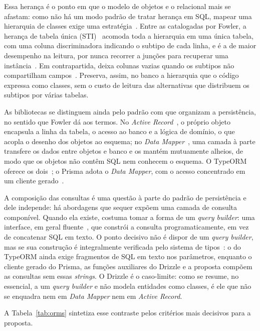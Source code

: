 Essa herança é o ponto em que o modelo de objetos e o relacional mais se afastam: como não há um modo padrão de tratar herança em SQL, mapear uma hierarquia de classes exige uma estratégia~\cite[p.~62]{fowler}. Entre as catalogadas por Fowler, a herança de tabela única (STI)~\cite[p.~269]{fowler} acomoda toda a hierarquia em uma única tabela, com uma coluna discriminadora indicando o subtipo de cada linha, e é a de maior desempenho na leitura, por nunca recorrer a junções para recuperar uma instância~\cite{openjpa}. Em contrapartida, deixa colunas vazias quando os subtipos não compartilham campos~\cite[p.~270]{fowler}. Preserva, assim, no banco a hierarquia que o código expressa como classes, sem o custo de leitura das alternativas que distribuem os subtipos por várias tabelas.

As bibliotecas se distinguem ainda pelo padrão com que organizam a persistência, no sentido que Fowler dá aos termos. No \emph{Active Record}~\cite[p.~165]{fowler}, o próprio objeto encapsula a linha da tabela, o acesso ao banco e a lógica de domínio, o que acopla o desenho dos objetos ao esquema; no \emph{Data Mapper}~\cite[p.~170]{fowler}, uma camada à parte transfere os dados entre objetos e banco e os mantém mutuamente alheios, de modo que os objetos não contêm SQL nem conhecem o esquema. O TypeORM oferece os dois~\cite{typeorm}; o Prisma adota o \emph{Data Mapper}, com o acesso concentrado em um cliente gerado~\cite{prisma}.

A composição das consultas é uma questão à parte do padrão de persistência e dele independe: há abordagens que sequer expõem uma camada de consulta componível. Quando ela existe, costuma tomar a forma de um \emph{query builder}: uma interface, em geral fluente~\cite{fowler-fluent}, que constrói a consulta programaticamente, em vez de concatenar SQL em texto. O ponto decisivo não é dispor de um \emph{query builder}, mas se sua construção é integralmente verificada pelo sistema de tipos~\cite{gil2010}: o do TypeORM ainda exige fragmentos de SQL em texto nos parâmetros, enquanto o cliente gerado do Prisma, as funções auxiliares do Drizzle e a proposta compõem as consultas sem essas \emph{strings}. O Drizzle é o caso-limite: como se resume, no essencial, a um \emph{query builder} e não modela entidades como classes, é ele que não se enquadra nem em \emph{Data Mapper} nem em \emph{Active Record}.

A Tabela~\ref{tab:orms} sintetiza esse contraste pelos critérios mais decisivos para a proposta.

